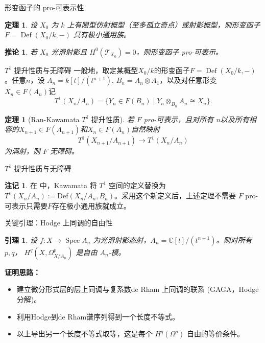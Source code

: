 \documentclass{beamer}
\theoremstyle{definition}
\newtheorem{remark}[defn]{注记}
\theoremstyle{plain}
\newtheorem{thm}[defn]{定理}
\newtheorem{lem}[defn]{引理}
\newtheorem{cor}[defn]{推论}
\begin{document}
\begin{frame}{形变函子的 pro-可表示性}
\begin{thm}
设 $X_0$ 为 $k$ 上有限型仿射概型（至多孤立奇点）或射影概型，则形变函子 $F=\operatorname{Def}(X_0/k,-)$ 具有极小通用族。
\end{thm}
\begin{cor}
若 $X_0$ 光滑射影且 $H^0(\mathcal{T}_{X_0})=0$，则形变函子 pro-可表示。
\end{cor}
\end{frame}

\begin{frame}{$T^1$ 提升性质与无障碍}
一般地，取定某概型$ X_0/k $的形变函子$ F=\operatorname{Def}(X_0/k,-) $。任意$ n $，设 $A_n=k[t]/(t^{n+1})$, $B_n=A_n\otimes A_1$，以及对任意形变 $X_n\in F(A_n)$记
\[
T^1(X_n/A_n)=\{Y_n\in F(B_n)\mid Y_n\otimes_{B_n}A_n \cong X_n\}.
\]
\begin{thm}[Ran-Kawamata $ T^1 $ 提升性质\cite{Kawamata92}]
若 $F$ pro-可表示，且对所有 $n$以及所有相容的$ X_{n+1}\in F(A_{n+1}) $和$ X_n\in F(A_n) $自然映射
\[
T^1(X_{n+1}/A_{n+1})\to T^1(X_n/A_n)
\]
为满射，则 $F$ 无障碍。
\end{thm}
\end{frame}

\begin{frame}{$T^1$ 提升性质与无障碍}
    \begin{remark}
        在\cite{Kawamata97} 中，Kawamata 将 \(T^1\) 空间的定义替换为 \(T^1(X_n/A_n):=\mathrm{Def}(X_n/A_n,B_n)\)。采用这个新定义后，上述定理不需要 \(F\)  pro-可表示只需要$ F $存在极小通用族就成立。
    \end{remark}
\end{frame}

\begin{frame}{关键引理：Hodge 上同调的自由性}
\begin{lem}
设 $f:X\to \operatorname{Spec} A_n$ 为光滑射影态射，$A_n=\mathbb{C}[t]/(t^{n+1})$。则对所有 $p,q$，
$H^q(X,\Omega^p_{X/A_n})$ 是自由 $A_n$-模。
\end{lem}
\textbf{证明思路：}
\begin{itemize}
    \item 建立微分形式层的层上同调与复系数de Rham 上同调的联系 (GAGA，Hodge分解)。
    \item 利用Hodge到de Rham谱序列得到一个长度不等式。
    \item 以上导出另一个长度不等式取等，这是每个 $H^q(\Omega^p)$ 自由的等价条件。
\end{itemize}
\end{frame}
\end{document}
